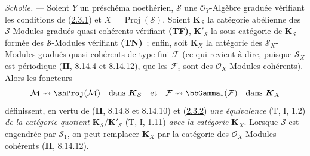 \begin{env}[2.3.3]
\label{III.2.3.3-fr}
\emph{Scholie.} --- Soient $Y$ un préschéma noethérien, $\mathcal S$ une
$\mathcal O_Y$-Algèbre graduée vérifiant les conditions de
(\hyperref[III.2.3.1-fr]{2.3.1}) et $X=\operatorname{Proj}(\mathcal S)$.
Soient $\boldsymbol{K}_{\mathcal S}$ la catégorie abélienne des $\mathcal S$-Modules
gradués quasi-cohérents vérifiant \textbf{(TF)}, $\boldsymbol{K}'_{\mathcal S}$ la
sous-catégorie de $\boldsymbol{K}_{\mathcal S}$ formée des $\mathcal S$-Modules
vérifiant \textbf{(TN)}~; enfin, soit $\boldsymbol{K}_X$ la catégorie des
$\mathcal S_X$-Modules gradués quasi-cohérents de type fini $\mathcal F$
(ce qui revient à dire, puisque $\mathcal S_X$ est périodique
(\textbf{II}, 8.14.4 et 8.14.12), que les $\mathcal F_i$ sont des
$\mathcal O_X$-Modules cohérents). Alors les foncteurs
\[
\mathcal M\leadsto\shProj(\mathcal M)
\quad\text{dans }\boldsymbol{K}_{\mathcal S}
\quad\text{et}\quad
\mathcal F\leadsto\bbGamma_*(\mathcal F)
\quad\text{dans }\boldsymbol{K}_X
\]
définissent, en vertu de (\textbf{II}, 8.14.8 et 8.14.10) et
(\hyperref[III.2.3.2-fr]{2.3.2}) \emph{une équivalence} (T, I, 1.2) \emph{de la
catégorie quotient} $\boldsymbol{K}_{\mathcal S}/\boldsymbol{K}'_{\mathcal S}$ (T, I, 1.11) \emph{avec la
catégorie} $\boldsymbol{K}_X$. Lorsque $\mathcal S$ est engendrée par $\mathcal S_1$,
on peut remplacer $\boldsymbol{K}_X$ par la catégorie des $\mathcal O_X$-Modules
cohérents (\textbf{II}, 8.14.12).
\end{env}

